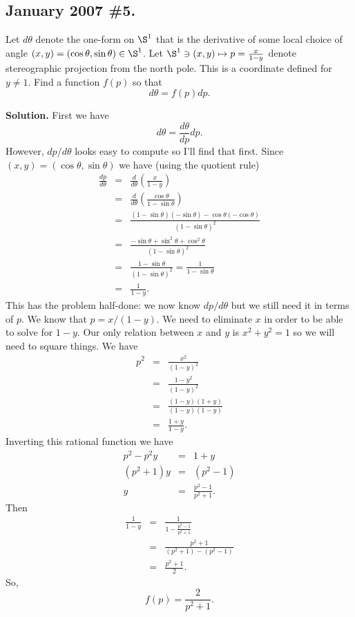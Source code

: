 \documentclass[10pt]{article}
\numberwithin{equation}{subsection}
\begin{document}

\subsection{January 2007 \#5.}
\label{sec:J07.5}

Let $d\theta$ denote the one-form on $\S^1$ that is the derivative of
some local choice of angle $(x,y)=(\cos\theta,\sin\theta) \in \S^1$.
Let $\S^1 \ni (x,y) \mapsto p=\frac{x}{1-y}$ denote stereographic
projection from the north pole.  This is a coordinate defined for $y\ne 1$.
Find a function $f(p)$ so that
$$
	d\theta = f(p)dp.
$$

\textbf{Solution.}  First we have
$$
	d\theta = \frac{d\theta}{dp} dp.
$$
However, $dp/d\theta$ looks easy to compute so I'll find that first.
Since $(x,y) = (\cos\theta,\sin\theta)$ we have (using the quotient rule)
\begin{eqnarray*}
	\frac{dp}{d\theta}
		&=& \frac{d}{d\theta}\left(\frac{x}{1-y}\right) \\
	&=& \frac{d}{d\theta}\left(\frac{\cos\theta}{1-\sin\theta}\right) \\
	&=& \frac{(1-\sin\theta)(-\sin\theta) - \cos\theta(-\cos\theta)}{(1-\sin\theta)^2} \\
	&=& \frac{-\sin\theta+\sin^2\theta +\cos^2\theta}{(1-\sin\theta)^2} \\
	&=& \frac{1-\sin\theta}{(1-\sin\theta)^2} = \frac{1}{1-\sin\theta} \\
	&=& \frac{1}{1-y}.
\end{eqnarray*}
This has the problem half-done:  we now know $dp/d\theta$ but we still need it
in terms of $p$.  We know that $p=x/(1-y)$.  We need to eliminate $x$ in order
to be able to solve for $1-y$.  Our only relation between $x$ and $y$ is
$x^2+y^2=1$ so we will need to square things.  We have
\begin{eqnarray*}
	p^2 &=& \frac{x^2}{(1-y)^2} \\
	&=& \frac{1-y^2}{(1-y)^2} \\
	&=& \frac{(1-y)(1+y)}{(1-y)(1-y)} \\
	&=& \frac{1+y}{1-y}.
\end{eqnarray*}
Inverting this rational function we have
\begin{eqnarray*}
	p^2-p^2y &=& 1+y \\
	(p^2+1)y &=& (p^2-1) \\
	y &=& \frac{p^2-1}{p^2+1}.
\end{eqnarray*}
Then
\begin{eqnarray*}
	\frac{1}{1-y} &=& \frac{1}{1 - \frac{p^2-1}{p^2+1}} \\
	&=& \frac{p^2+1}{(p^2+1) - (p^2-1)} \\
	&=& \frac{p^2+1}{2}.
\end{eqnarray*}
So,
$$
	f(p) = \frac{2}{p^2+1}.
$$
\end{document}
